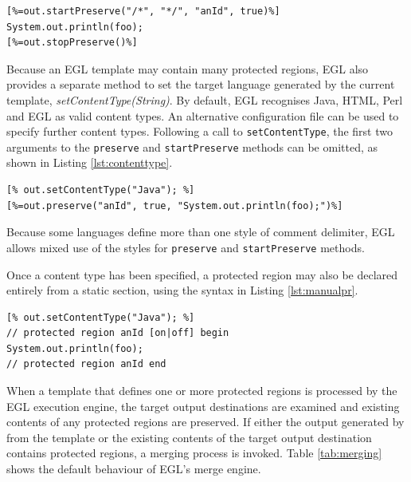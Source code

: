 \begin{lstlisting}[basicstyle=\ttfamily\footnotesize, language=EGL, tabsize=2, flexiblecolumns=true, caption=Protected region declaration., label=lst:startpreserve]
[%=out.startPreserve("/*", "*/", "anId", true)%]
System.out.println(foo);
[%=out.stopPreserve()%]
\end{lstlisting}

Because an EGL template may contain many protected regions, EGL also
provides a separate method to set the target language generated by the
current template, \emph{setContentType(String)}. By default, EGL recognises Java, HTML, 
Perl and EGL as valid content types. An alternative configuration file
can be used to specify further content
types. Following a call to \verb|setContentType|, the first two
arguments to the \verb|preserve| and \verb|startPreserve| methods can
be omitted, as shown in Listing \ref{lst:contenttype}.

\begin{lstlisting}[basicstyle=\ttfamily\footnotesize, language=EGL, tabsize=2, flexiblecolumns=true, caption=Setting the content type., label=lst:contenttype]
[% out.setContentType("Java"); %]
[%=out.preserve("anId", true, "System.out.println(foo);")%]
\end{lstlisting}

Because some languages define more than one style of comment
delimiter, EGL allows mixed use of  the styles for \verb|preserve| and
\verb|startPreserve| methods.

Once a content type has been specified, a protected region may also be declared entirely from a static section, using the syntax in Listing \ref{lst:manualpr}.

\begin{lstlisting}[basicstyle=\ttfamily\footnotesize, language=EGL, tabsize=2, flexiblecolumns=true, caption=Declaring a protected region from within a static section., label=lst:manualpr]
[% out.setContentType("Java"); %]
// protected region anId [on|off] begin
System.out.println(foo);
// protected region anId end
\end{lstlisting}

When a template that defines one or more protected regions is
processed by the EGL execution engine, the target output destinations
are examined and existing contents of any protected regions are
preserved. If either the output generated by from the template or the
existing contents of the target output destination contains protected
regions, a merging process is invoked. Table \ref{tab:merging} shows
the default behaviour of EGL's merge engine.

